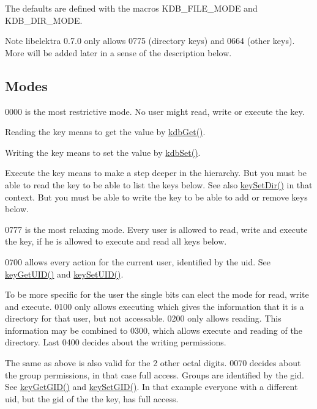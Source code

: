 The defaults are defined with the macros KDB\_\-FILE\_\-MODE and KDB\_\-DIR\_\-MODE.

\begin{DoxyNote}{Note}
libelektra 0.7.0 only allows 0775 (directory keys) and 0664 (other keys). More will be added later in a sense of the description below.
\end{DoxyNote}
\hypertarget{group__keymeta_mode}{}\subsection{Modes}\label{group__keymeta_mode}
0000 is the most restrictive mode. No user might read, write or execute the key.

Reading the key means to get the value by \hyperlink{group__kdb_ga28e385fd9cb7ccfe0b2f1ed2f62453a1}{kdbGet()}.

Writing the key means to set the value by \hyperlink{group__kdb_ga11436b058408f83d303ca5e996832bcf}{kdbSet()}.

Execute the key means to make a step deeper in the hierarchy. But you must be able to read the key to be able to list the keys below. See also \hyperlink{group__keymeta_gaae575bd86a628a15ee45baa860522e75}{keySetDir()} in that context. But you must be able to write the key to be able to add or remove keys below.

0777 is the most relaxing mode. Every user is allowed to read, write and execute the key, if he is allowed to execute and read all keys below.

0700 allows every action for the current user, identified by the uid. See \hyperlink{group__keymeta_gacaa5060e67b03f50ae49a3620c54bc46}{keyGetUID()} and \hyperlink{group__keymeta_gab5f284f5ecd261e0a290095f50ba1af7}{keySetUID()}.

To be more specific for the user the single bits can elect the mode for read, write and execute. 0100 only allows executing which gives the information that it is a directory for that user, but not accessable. 0200 only allows reading. This information may be combined to 0300, which allows execute and reading of the directory. Last 0400 decides about the writing permissions.

The same as above is also valid for the 2 other octal digits. 0070 decides about the group permissions, in that case full access. Groups are identified by the gid. See \hyperlink{group__keymeta_ga46a95e81d7d7f4e3eb59e60e5f3738c0}{keyGetGID()} and \hyperlink{group__keymeta_ga9e3d0fb3f7ba906e067727b9155d22e3}{keySetGID()}. In that example everyone with a different uid, but the gid of the the key, has full access.

